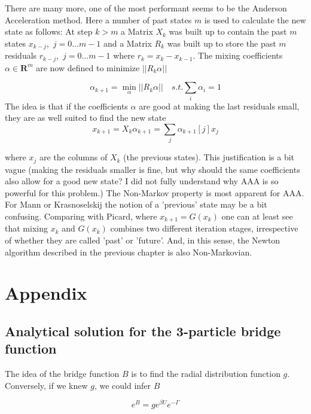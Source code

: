\documentclass[11pt,a4paper]{article}
\begin{document}
There are many more, one of the most performant seems to be the Anderson Acceleration method. Here a number of past states $m$
is used to calculate the new state as follows: At step $k > m$ a Matrix $X_k$ was built up to contain the past $m$ states $x_{k-j}$, $\, j=0...m-1$
and a Matrix $R_k$ was built up to store the past $m$ residuals $r_{k-j}$, $\, j=0...m-1$ where $r_k = x_k - x_{k-1}$. 
The mixing coefficients $\alpha \in \mathbf{R}^{m}$ are now defined to minimize $|| R_k \alpha ||$

\begin{equation}
\alpha_{k+1} = \min_{\alpha} || R_k \alpha || \quad s.t. \sum_i \alpha_i = 1
\end{equation}
The idea is that if the coefficients $\alpha$ are good at making the last residuals small, they are as well suited to find
the new state
\begin{equation}
x_{k+1} = X_k \alpha_{k+1} = \sum_j \alpha_{k+1}[j]x_j
\end{equation}

where $x_j$ are the columns of $X_k$ (the previous states). \newline This justification is a bit vague (making the residuals smaller
is fine, but why should the same coefficients also allow for a good new state? I did not fully understand why AAA is so
powerful for this problem.)\newline
The Non-Markov property is most apparent for AAA. For Mann or Krasnoselskij the notion of a 'previous' state may be a bit confusing.
Comparing with Picard, where $x_{k+1} = G(x_k)$ one can at least see that mixing  $x_{k}$ and $G(x_k)$ combines two different iteration
stages, irrespective of whether they are called 'past' or 'future'. And, in this sense, the Newton algorithm described in the previous
chapter is also Non-Markovian.
\newpage


\section{Appendix}
\subsection{Analytical solution for the 3-particle bridge function}
The idea of the bridge function $B$ is to find the radial distribution function $g$. Conversely, if we knew $g$, we could infer $B$

\begin{equation}
e^{B} = g e^{\beta U} e^{-\Gamma}
\end{equation}
\end{document}
